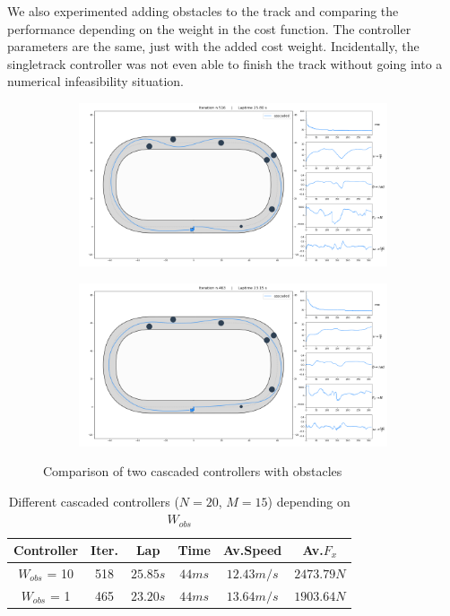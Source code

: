 \documentclass[a4paper, onecolumn, 12pt]{article}
\begin{document}
We also experimented adding obstacles to the track and comparing the performance
depending on the weight in the cost function. The controller parameters are the
same, just with the added cost weight. Incidentally, the singletrack controller
was not even able to finish the track without going into a numerical
infeasibility situation. 
\begin{figure}[H]
    \centering
    \begin{subfigure}{0.9\textwidth}
        \centering
        \includegraphics[width=\textwidth]{assets/obstacles1_ippodromo.png}
        \label{obs1}
    \end{subfigure}
    \begin{subfigure}{0.9\textwidth}
        \centering
        \includegraphics[width=\textwidth]{assets/obstacle2_ippodromo.png}
    \end{subfigure}
    \caption[short]{Comparison of two cascaded controllers with obstacles}
\end{figure}
\begin{table}[H] 
    \centering
    \caption{Different cascaded controllers ($N=20$, $M=15$) depending on $W_{obs}$} \label{obstacles_ippodromo}
    \begin{tabular}{|c||c|c|c|c|c|}
        \hline
        \textbf{Controller} & \textbf{Iter.} & \textbf{Lap} & \textbf{Time} & \textbf{Av.Speed} & \textbf{Av.$F_x$} \\ [0.5ex] 
        \hline
        \hline
        $W_{obs}$ = 10 & 518 & $25.85 s$ & $44 ms$ & $12.43 m/s$ & $2473.79 N$\\
        \hline
        $W_{obs}$ = 1 & 465 & $23.20 s$ & $44 ms$ & $13.64 m/s$ & $1903.64 N$\\
        \hline
    \end{tabular}
\end{table}
\end{document}
